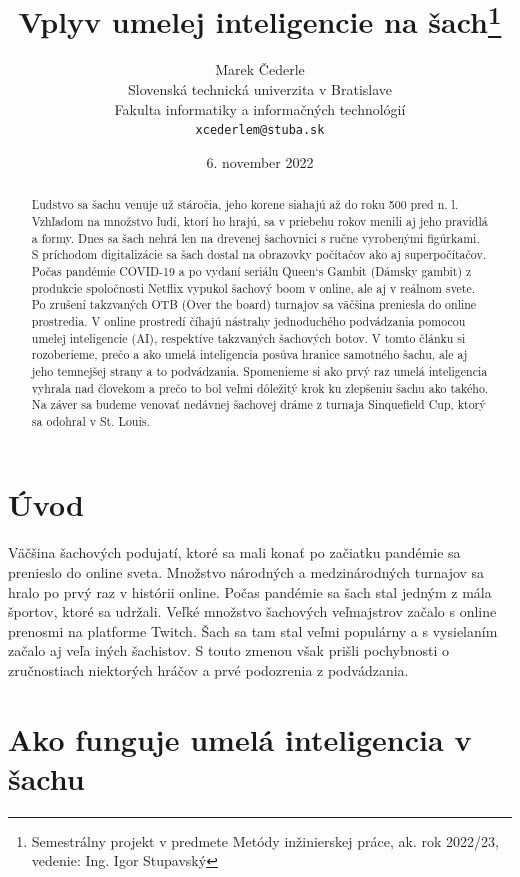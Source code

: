 \documentclass[10pt,oneside,slovak,a4paper]{article}
\title{Vplyv umelej inteligencie na šach\thanks{Semestrálny projekt v predmete Metódy inžinierskej práce, ak. rok 2022/23, vedenie: Ing. Igor Stupavský }}
\author{Marek Čederle\\[2pt]
	{\small Slovenská technická univerzita v Bratislave}\\
	{\small Fakulta informatiky a informačných technológií}\\
	{\small \texttt{xcederlem@stuba.sk}}
	}
\date{\small 6. november 2022}
\begin{document}
\maketitle

\vspace*{\fill}

\begin{abstract}
Ľudstvo sa šachu venuje už stáročia, jeho korene siahajú až do roku 500 pred n. l. Vzhľadom na množstvo ľudí, ktorí ho hrajú, sa v priebehu rokov menili aj jeho pravidlá a formy. Dnes sa šach nehrá len na drevenej šachovnici s ručne vyrobenými figúrkami. S príchodom digitalizácie sa šach dostal na  obrazovky počítačov ako aj superpočítačov. Počas pandémie COVID-19 a po vydaní seriálu Queen‘s Gambit (Dámsky gambit) z produkcie spoločnosti Netflix vypukol šachový boom v online, ale aj v reálnom svete. Po zrušení takzvaných OTB (Over the board) turnajov sa väčšina preniesla do online prostredia. V online prostredí číhajú nástrahy jednoduchého podvádzania pomocou umelej inteligencie (AI), respektíve takzvaných šachových botov. V tomto článku si rozoberieme, prečo a ako umelá inteligencia posúva hranice samotného šachu, ale aj jeho temnejšej strany a to podvádzania. Spomenieme si ako prvý raz umelá inteligencia vyhrala nad človekom a prečo to bol veľmi dôležitý krok ku zlepšeniu šachu ako takého. Na záver sa budeme venovať nedávnej šachovej dráme z turnaja Sinquefield Cup, ktorý sa odohral v St. Louis.
\end{abstract}

\vspace*{\fill}
\pagebreak


\section{Úvod}

Väčšina šachových podujatí, ktoré sa mali konať po začiatku pandémie sa prenieslo do online sveta. Množstvo národných a medzinárodných turnajov sa hralo po prvý raz v histórii online. Počas pandémie sa šach stal jedným z mála športov, ktoré sa udržali. Veľké množstvo šachových veľmajstrov začalo s online prenosmi na platforme Twitch. Šach sa tam stal veľmi populárny a s vysielaním začalo aj veľa iných šachistov. S touto zmenou však  prišli pochybnosti o zručnostiach niektorých hráčov a prvé podozrenia z podvádzania.



\section{Ako funguje umelá inteligencia v šachu}
\end{document}
